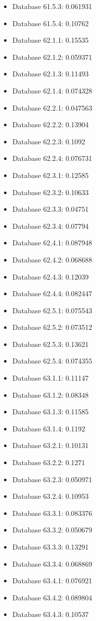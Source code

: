 \begin{itemize}
\item Database 61.5.3: 0.061931
\item Database 61.5.4: 0.10762
\item Database 62.1.1: 0.15535
\item Database 62.1.2: 0.059371
\item Database 62.1.3: 0.11493
\item Database 62.1.4: 0.074328
\item Database 62.2.1: 0.047563
\item Database 62.2.2: 0.13904
\item Database 62.2.3: 0.1092
\item Database 62.2.4: 0.076731
\item Database 62.3.1: 0.12585
\item Database 62.3.2: 0.10633
\item Database 62.3.3: 0.04751
\item Database 62.3.4: 0.07794
\item Database 62.4.1: 0.087948
\item Database 62.4.2: 0.068688
\item Database 62.4.3: 0.12039
\item Database 62.4.4: 0.082447
\item Database 62.5.1: 0.075543
\item Database 62.5.2: 0.073512
\item Database 62.5.3: 0.13621
\item Database 62.5.4: 0.074355
\item Database 63.1.1: 0.11147
\item Database 63.1.2: 0.08348
\item Database 63.1.3: 0.11585
\item Database 63.1.4: 0.1192
\item Database 63.2.1: 0.10131
\item Database 63.2.2: 0.1271
\item Database 63.2.3: 0.050971
\item Database 63.2.4: 0.10953
\item Database 63.3.1: 0.083376
\item Database 63.3.2: 0.050679
\item Database 63.3.3: 0.13291
\item Database 63.3.4: 0.068869
\item Database 63.4.1: 0.076921
\item Database 63.4.2: 0.089804
\item Database 63.4.3: 0.10537

\end{itemize}
